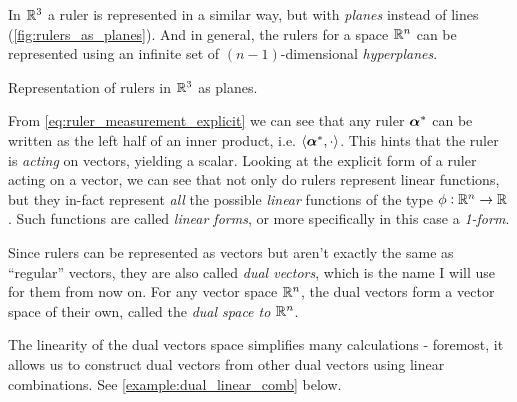 In $\Rs[3]$ a ruler is represented in a similar way, but with \textit{planes} instead of lines (\autoref{fig:rulers_as_planes}). And in general, the rulers for a space $\Rs[n]$ can be represented using an infinite set of $(n-1)$-dimensional \textit{hyperplanes}.

\begin{marginfigure}
    \begin{center}
    \end{center}
    \caption{Representation of rulers in $\Rs[3]$ as planes.}
    \label{fig:rulers_as_planes}
\end{marginfigure}

From \autoref{eq:ruler_measurement_explicit} we can see that any ruler $\dualvec{\alpha}$ can be written as the left half of an inner product, i.e. $\inner{\dualvec{\alpha}}{\cdot}$. This hints that the ruler is \textit{acting} on vectors, yielding a scalar. Looking at the explicit form of a ruler acting on a vector, we can see that not only do rulers represent linear functions, but they in-fact represent \textit{all} the possible \textit{linear} functions of the type $\phi:\Rs[n]\to\Rs$. Such functions are called \textit{linear forms}, or more specifically in this case a \textit{1-form}.

Since rulers can be represented as vectors but aren't exactly the same as \enquote{regular} vectors, they are also called \textit{dual vectors}, which is the name I will use for them from now on. For any vector space $\Rs[n]$, the dual vectors form a vector space of their own, called the \textit{dual space to $\Rs[n]$}.

The linearity of the dual vectors space simplifies many calculations - foremost, it allows us to construct dual vectors from other dual vectors using linear combinations. See \autoref{example:dual_linear_comb} below.

